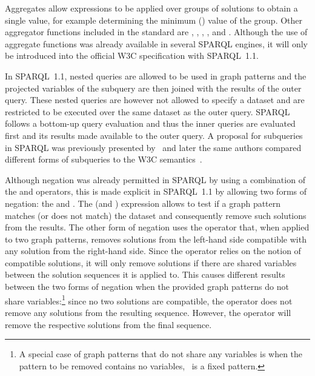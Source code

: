 Aggregates allow expressions to be applied over groups of solutions to obtain a single value, for example determining
the minimum () value of the group.  Other aggregator functions included in the standard are
, , , , and .
%
Although the use of aggregate functions was already available in several SPARQL engines, it will only be introduced into
the official \ac{W3C} specification with SPARQL~1.1.
%


In SPARQL~1.1, nested \SELECT queries are allowed to be used in graph patterns and the projected variables of the
subquery are then joined with the results of the outer query.  These nested \SELECT queries are however not allowed to
specify a dataset and are restricted to be executed over the same dataset as the outer query.  SPARQL follows a
bottom-up query evaluation and thus the inner queries are evaluated first and its results made available to the outer
query.
%
A proposal for subqueries in SPARQL was previously presented by~\citet{AnglesGutierrez:2010aa} and later the same authors
compared different forms of subqueries to the W3C semantics~\cite{AnglesGutierrez:2011aa}.
%



Although negation was already permitted in SPARQL by using a combination of the \FILTER and \BOUND operators, this is
made explicit in SPARQL~1.1 by allowing two forms of negation: the  and .
%
The  (and ) \FILTER expression allows to test if a graph pattern matches (or does
not match) the dataset and consequently remove such solutions from the results.
%
The other form of negation uses the  operator that, when applied to two graph patterns, removes solutions
from the left-hand side compatible with any solution from the right-hand side.
%
Since the  operator relies on the notion of compatible solutions, it will only remove solutions if there
are shared variables between the solution sequences it is applied to.
%
This causes different results between the two forms of negation when the provided graph patterns do not share
variables:\footnote{A special case of graph patterns that do not share any variables is when the pattern to be removed
  contains no variables, \ie~is a fixed pattern.}
%
since no two solutions are compatible, the  operator does not remove any solutions from the resulting
sequence.  However, the  operator will remove the respective solutions from the final sequence.
%

